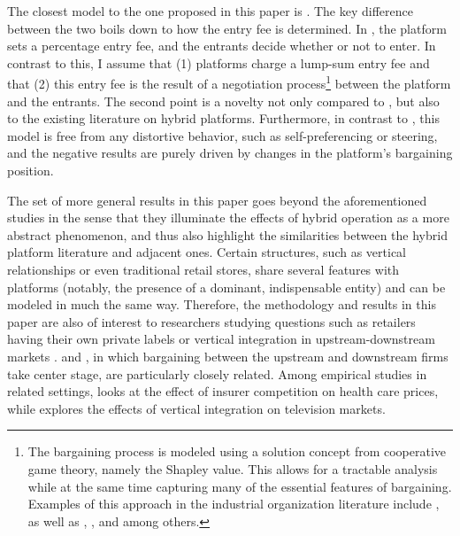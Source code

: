 The closest model to the one proposed in this paper is \textcite{anderson2021hybrid}.
The key difference between the two boils down to how the entry fee is determined.
In \textcite{anderson2021hybrid}, the platform sets a percentage entry fee, and the entrants decide whether or not to enter.
In contrast to this, I assume that (1) platforms charge a lump-sum entry fee and that (2) this entry fee is the result of a negotiation process\footnote{
    The bargaining process is modeled using a solution concept from cooperative game theory, namely the Shapley value.
    This allows for a tractable analysis while at the same time capturing many of the essential features of bargaining.
    Examples of this approach in the industrial organization literature include \textcite{montez2007downstream}, as well as \textcite{hart1990property}, \textcite{levy1997individual}, \textcite{inderst2003bargaining} and \textcite{brugemann2019intra} among others.
}
between the platform and the entrants.
The second point is a novelty not only compared to \textcite{anderson2021hybrid}, but also to the existing literature on hybrid platforms.
Furthermore, in contrast to \textcite{hagiu2022should}, this model is free from any distortive behavior, such as self-preferencing or steering, and the negative results are purely driven by changes in the platform's bargaining position.

The set of more general results in this paper goes beyond the aforementioned studies in the sense that they illuminate the effects of hybrid operation as a more abstract phenomenon, and thus also highlight the similarities between the hybrid platform literature and adjacent ones.
Certain structures, such as vertical relationships or even traditional retail stores, share several features with platforms (notably, the presence of a dominant, indispensable entity) and can be modeled in much the same way.
Therefore, the methodology and results in this paper are also of interest to researchers studying questions such as retailers having their own private labels \parencite{steiner2004nature} or vertical integration in upstream-downstream markets \parencite{hart1990vertical,aghion2006vertical}.
\textcite{de2005vertical} and \textcite{montez2007downstream}, in which bargaining between the upstream and downstream firms take center stage, are particularly closely related.
Among empirical studies in related settings, \textcite{ho2017insurer} looks at the effect of insurer competition on health care prices, while \textcite{crawford2018welfare} explores the effects of vertical integration on television markets.

